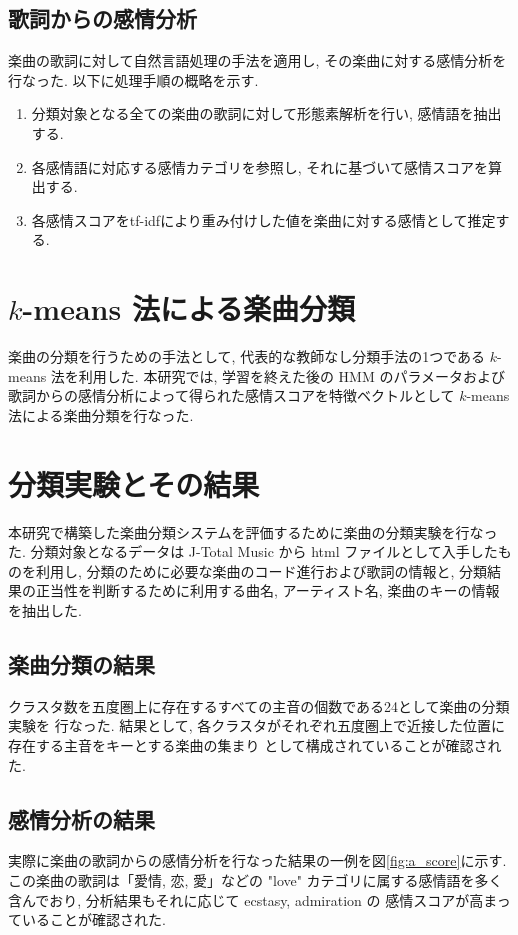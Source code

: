\documentclass{jpreprint}
\begin{document}
\begin{multicols}{2}
\subsection{歌詞からの感情分析}
楽曲の歌詞に対して自然言語処理の手法を適用し,
その楽曲に対する感情分析を行なった.
以下に処理手順の概略を示す.
\begin{enumerate}
\renewcommand{\labelenumi}{(\arabic{enumi})}
\item 分類対象となる全ての楽曲の歌詞に対して形態素解析を行い, 感情語を抽出する.
\item 各感情語に対応する感情カテゴリを参照し, それに基づいて感情スコアを算出する.
\item 各感情スコアをtf-idfにより重み付けした値を楽曲に対する感情として推定する.
\end{enumerate}

\section{$k$-means 法による楽曲分類}
楽曲の分類を行うための手法として,
代表的な教師なし分類手法の1つである $k$-means 法を利用した.
本研究では, 
学習を終えた後の HMM のパラメータおよび
歌詞からの感情分析によって得られた感情スコアを特徴ベクトルとして
$k$-means 法による楽曲分類を行なった.

\section{分類実験とその結果}
本研究で構築した楽曲分類システムを評価するために楽曲の分類実験を行なった.
分類対象となるデータは 
J-Total Music\cite{JTM} 
から html ファイルとして入手したものを利用し,
分類のために必要な楽曲のコード進行および歌詞の情報と,
分類結果の正当性を判断するために利用する曲名, アーティスト名, 
楽曲のキーの情報を抽出した. 

\subsection{楽曲分類の結果}
クラスタ数を五度圏上に存在するすべての主音の個数である24として楽曲の分類実験を
行なった.
結果として,
各クラスタがそれぞれ五度圏上で近接した位置に存在する主音をキーとする楽曲の集まり
として構成されていることが確認された.

\subsection{感情分析の結果}
実際に楽曲の歌詞からの感情分析を行なった結果の一例を図\ref{fig:a_score}に示す.
この楽曲の歌詞は「愛情, 恋, 愛」などの 
"love" カテゴリに属する感情語を多く含んでおり, 
分析結果もそれに応じて ecstasy, admiration の
感情スコアが高まっていることが確認された.



\end{multicols}
\end{document}
